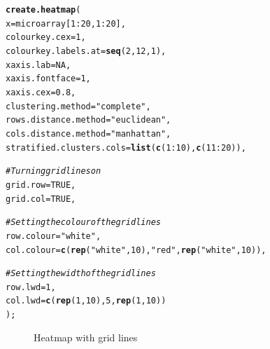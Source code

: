 \documentclass[letterpaper]{article}\usepackage[]{graphicx}\usepackage[]{color}
\makeatletter
\newcommand{\hlnum}[1]{\textcolor[rgb]{0.686,0.059,0.569}{#1}}%
\newcommand{\hlstr}[1]{\textcolor[rgb]{0.192,0.494,0.8}{#1}}%
\newcommand{\hlcom}[1]{\textcolor[rgb]{0.678,0.584,0.686}{\textit{#1}}}%
\newcommand{\hlopt}[1]{\textcolor[rgb]{0,0,0}{#1}}%
\newcommand{\hlstd}[1]{\textcolor[rgb]{0.345,0.345,0.345}{#1}}%
\newcommand{\hlkwc}[1]{\textcolor[rgb]{0.333,0.667,0.333}{#1}}%
\newcommand{\hlkwd}[1]{\textcolor[rgb]{0.737,0.353,0.396}{\textbf{#1}}}%
\newenvironment{kframe}{%
 \def\at@end@of@kframe{}%
 \ifinner\ifhmode%
  \def\at@end@of@kframe{\end{minipage}}%
  \begin{minipage}{\columnwidth}%
 \fi\fi%
 \def\FrameCommand##1{\hskip\@totalleftmargin \hskip-\fboxsep
 \colorbox{shadecolor}{##1}\hskip-\fboxsep
     \hskip-\linewidth \hskip-\@totalleftmargin \hskip\columnwidth}%
 \MakeFramed {\advance\hsize-\width
   \@totalleftmargin\z@ \linewidth\hsize
   \@setminipage}}%
 {\par\unskip\endMakeFramed%
 \at@end@of@kframe}
\newenvironment{knitrout}{}{} %
\makeatother
\begin{document}
\begin{knitrout}
\color{fgcolor}\begin{kframe}
\begin{alltt}
\hlkwd{create.heatmap}\hlstd{(}
    \hlkwc{x} \hlstd{= microarray[}\hlnum{1}\hlopt{:}\hlnum{20}\hlstd{,} \hlnum{1}\hlopt{:}\hlnum{20}\hlstd{],}
    \hlkwc{colourkey.cex} \hlstd{=} \hlnum{1}\hlstd{,}
    \hlkwc{colourkey.labels.at} \hlstd{=} \hlkwd{seq}\hlstd{(}\hlnum{2}\hlstd{,} \hlnum{12}\hlstd{,} \hlnum{1}\hlstd{),}
    \hlkwc{xaxis.lab} \hlstd{=} \hlnum{NA}\hlstd{,}
    \hlkwc{xaxis.fontface} \hlstd{=} \hlnum{1}\hlstd{,}
    \hlkwc{xaxis.cex} \hlstd{=} \hlnum{0.8}\hlstd{,}
    \hlkwc{clustering.method} \hlstd{=} \hlstr{"complete"}\hlstd{,}
    \hlkwc{rows.distance.method} \hlstd{=} \hlstr{"euclidean"}\hlstd{,}
    \hlkwc{cols.distance.method} \hlstd{=} \hlstr{"manhattan"}\hlstd{,}
    \hlkwc{stratified.clusters.cols} \hlstd{=} \hlkwd{list}\hlstd{(}\hlkwd{c}\hlstd{(}\hlnum{1}\hlopt{:}\hlnum{10}\hlstd{),} \hlkwd{c}\hlstd{(}\hlnum{11}\hlopt{:}\hlnum{20}\hlstd{)),}

    \hlcom{# Turning grid lines on}
    \hlkwc{grid.row} \hlstd{=} \hlnum{TRUE}\hlstd{,}
    \hlkwc{grid.col} \hlstd{=} \hlnum{TRUE}\hlstd{,}

    \hlcom{# Setting the colour of the grid lines }
    \hlkwc{row.colour} \hlstd{=} \hlstr{"white"}\hlstd{,}
    \hlkwc{col.colour} \hlstd{=} \hlkwd{c}\hlstd{(}\hlkwd{rep}\hlstd{(}\hlstr{"white"}\hlstd{,} \hlnum{10}\hlstd{),} \hlstr{"red"}\hlstd{,} \hlkwd{rep}\hlstd{(}\hlstr{"white"}\hlstd{,}\hlnum{10}\hlstd{)),}

    \hlcom{# Setting the width of the grid lines}
    \hlkwc{row.lwd} \hlstd{=} \hlnum{1}\hlstd{,}
    \hlkwc{col.lwd} \hlstd{=} \hlkwd{c}\hlstd{(}\hlkwd{rep}\hlstd{(}\hlnum{1}\hlstd{,} \hlnum{10}\hlstd{),} \hlnum{5}\hlstd{,} \hlkwd{rep}\hlstd{(}\hlnum{1}\hlstd{,}\hlnum{10}\hlstd{))}
    \hlstd{);}
\end{alltt}
\end{kframe}\begin{figure}[]


{\centering {} 

}

\caption[Heatmap with grid lines]{Heatmap with grid lines\label{fig:heatmap6}}
\end{figure}


\end{knitrout}
\end{document}
